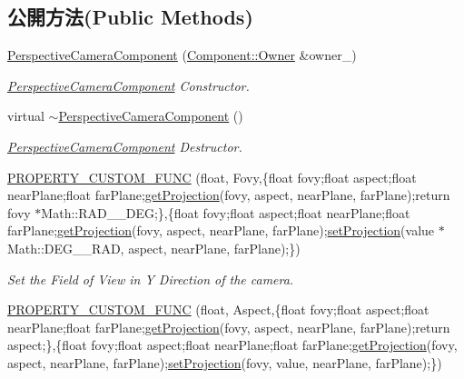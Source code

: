 \subsection*{公開方法(Public Methods)}
\begin{DoxyCompactItemize}
\item 
\hyperlink{class_i_dream_sky_1_1_perspective_camera_component_a63c001a1398786823ee01bdf7bf38cb9}{Perspective\+Camera\+Component} (\hyperlink{class_i_dream_sky_1_1_component_1_1_owner}{Component\+::\+Owner} \&owner\+\_\+)
\begin{DoxyCompactList}\small\item\em \hyperlink{class_i_dream_sky_1_1_perspective_camera_component}{Perspective\+Camera\+Component} Constructor. \end{DoxyCompactList}\item 
virtual \hyperlink{class_i_dream_sky_1_1_perspective_camera_component_a7fb684b3fb2c9e3e19ee017acac84327}{$\sim$\+Perspective\+Camera\+Component} ()
\begin{DoxyCompactList}\small\item\em \hyperlink{class_i_dream_sky_1_1_perspective_camera_component}{Perspective\+Camera\+Component} Destructor. \end{DoxyCompactList}\item 
\hyperlink{class_i_dream_sky_1_1_perspective_camera_component_a09beb3c6d8802414169dc543baaa2c5b}{P\+R\+O\+P\+E\+R\+T\+Y\+\_\+\+C\+U\+S\+T\+O\+M\+\_\+\+F\+U\+NC} (float, Fovy,\{float fovy;float aspect;float near\+Plane;float far\+Plane;\hyperlink{class_i_dream_sky_1_1_perspective_camera_component_ae3ce00b7bbf1c9e9e073f28793dd1645}{get\+Projection}(fovy, aspect, near\+Plane, far\+Plane);return fovy $\ast$Math\+::\+R\+A\+D\+\_\+\_\+\+D\+EG;\},\{float fovy;float aspect;float near\+Plane;float far\+Plane;\hyperlink{class_i_dream_sky_1_1_perspective_camera_component_ae3ce00b7bbf1c9e9e073f28793dd1645}{get\+Projection}(fovy, aspect, near\+Plane, far\+Plane);\hyperlink{class_i_dream_sky_1_1_perspective_camera_component_a6b49a13999f7fb6593ca845c10579795}{set\+Projection}(value $\ast$Math\+::\+D\+E\+G\+\_\+\_\+\+R\+AD, aspect, near\+Plane, far\+Plane);\})
\begin{DoxyCompactList}\small\item\em Set the Field of View in Y Direction of the camera. \end{DoxyCompactList}\item 
\hyperlink{class_i_dream_sky_1_1_perspective_camera_component_a67606128a80274c9039ace074652856b}{P\+R\+O\+P\+E\+R\+T\+Y\+\_\+\+C\+U\+S\+T\+O\+M\+\_\+\+F\+U\+NC} (float, Aspect,\{float fovy;float aspect;float near\+Plane;float far\+Plane;\hyperlink{class_i_dream_sky_1_1_perspective_camera_component_ae3ce00b7bbf1c9e9e073f28793dd1645}{get\+Projection}(fovy, aspect, near\+Plane, far\+Plane);return aspect;\},\{float fovy;float aspect;float near\+Plane;float far\+Plane;\hyperlink{class_i_dream_sky_1_1_perspective_camera_component_ae3ce00b7bbf1c9e9e073f28793dd1645}{get\+Projection}(fovy, aspect, near\+Plane, far\+Plane);\hyperlink{class_i_dream_sky_1_1_perspective_camera_component_a6b49a13999f7fb6593ca845c10579795}{set\+Projection}(fovy, value, near\+Plane, far\+Plane);\})

\end{DoxyCompactItemize}
